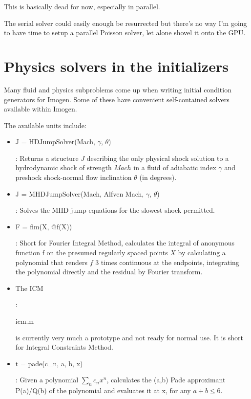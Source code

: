 \documentclass[letterpaper,12pt]{article}
\begin{document}
This is basically dead for now, especially in parallel.

The serial solver could easily enough be resurrected but there's no way I'm going
to have time to setup a parallel Poisson solver, let alone shovel it onto the GPU.

\section{Physics solvers in the initializers}

Many fluid and physics subproblems come up when writing initial condition generators
for Imogen. Some of these have convenient self-contained solvers available within
Imogen.

The available units include:
\begin{itemize}
\item \begin{tt}J = HDJumpSolver(Mach, $\gamma$, $\theta$)\end{tt}: Returns a structure $J$ describing the
only physical shock solution to a hydrodynamic shock of strength $Mach$ in a fluid of
adiabatic index $\gamma$ and preshock shock-normal flow inclination $\theta$ (in degrees).
\item \begin{tt}J = MHDJumpSolver(Mach, Alfven Mach, $\gamma$, $\theta$)\end{tt}: Solves the MHD jump
equations for the slowest shock permitted.
\item \begin{tt}F = fim(X, @f(X))\end{tt}: Short for Fourier Integral Method, calculates the integral of
anonymous function f on the presumed regularly spaced points $X$ by calculating a polynomial
that renders $f$ 3 times continuous at the endpoints, integrating the polynomial directly
and the residual by Fourier transform.
\item \begin{tt}The ICM\end{tt}: \begin{tt}icm.m\end{tt} is currently very much a prototype and not ready for normal use.
It is short for Integral Constraints Method.
\item \begin{tt}t = pade(c\_n, a, b, x)\end{tt}: Given a polynomial $\sum_n c_n x^n$, calculates the (a,b)
Pade approximant P(a)/Q(b) of the polynomial and evaluates it at x, for any $a+b \le 6$.

\end{itemize}
\end{document}
